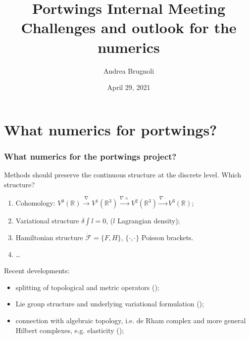 \documentclass{beamer}
\title{Portwings Internal Meeting\\
Challenges and outlook for the numerics}
\author[A.~Brugnoli]{Andrea Brugnoli} %
\institute[UT]{Department of Robotics and Mechatronics,\\ University of Twente}
\date[29-04-2021]{April 29, 2021}
\newcommand{\bbR}{\mathbb{R}}
\begin{document}
\maketitle

\section{What numerics for portwings?}

\begin{frame}\frametitle{What numerics for the portwings project?}
Methods should preserve the continuous structure at the discrete level. Which structure? 
\begin{enumerate}
	\item Cohomology: $V^0(\bbR) \xrightarrow{\nabla} V^1(\bbR^3) \xrightarrow{\nabla \times} V^2(\bbR^3) \xrightarrow{\nabla \cdot} V^3(\bbR)$;
	\item Variational structure $\delta \int l = 0$, ($l$ Lagrangian density);
	\item Hamiltonian structure $\dot{\mathcal{F}} = \{F, H\}$, $\{\cdot, \cdot\}$ Poisson brackets.
	\item \dots
\end{enumerate}
\vspace{.1cm}
Recent developments:
\begin{itemize}
\item splitting of topological and metric operators (\cite{bauer2018split});
\item Lie group structure and underlying variational formulation (\cite{gawlik2020variational});
\item connection with algebraic topology, i.e. de Rham complex and more general Hilbert complexes, e.g. elasticity (\cite{bochev2006mimetic,arnold2006acta,palha2014compatible}); 
\end{itemize}

\end{frame}
\end{document}
